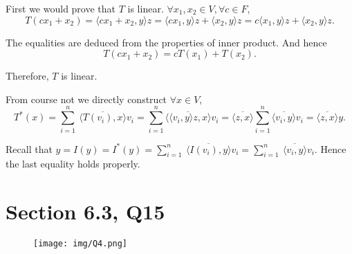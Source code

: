 \documentclass[12pt]{article}%
\begin{document}
First we would prove that $T$ is linear. $\forall x_1,x_2 \in V, \forall c \in F,$
$$T(cx_1+x_2)=\langle cx_1+x_2,y \rangle z = \langle cx_1,y \rangle z + \langle x_2,y \rangle z=c\langle x_1,y \rangle z+\langle x_2,y \rangle z.$$

The equalities are deduced from the properties of inner product. And hence $$T(cx_1+x_2)=cT(x_1)+T(x_2).$$

Therefore, $T$ is linear. 

From course not we directly construct $\forall x \in V,$ 
$$T^*(x)=\sum_{i=1}^n\ \overline{\langle T(v_i),x \rangle}v_i
=\sum_{i=1}^n \overline{ \langle \langle v_i,y \rangle z, x \rangle }v_i
=\overline{\langle z,x \rangle} \sum_{i=1}^n \overline{\langle v_i,y \rangle} v_i=\overline{\langle z,x \rangle}y.$$

Recall that $y=I(y)=I^*(y)=\sum_{i=1}^n\ \overline{\langle I(v_i),y \rangle}v_i=\sum_{i=1}^n\ \overline{\langle v_i,y \rangle}v_i.$ Hence the last 
equality holds properly.


\newpage

\section{Section 6.3, Q15}
\begin{figure}[htp]
    \centering %
    \texttt{[image: img/Q4.png]}
\end{figure}
\end{document}
